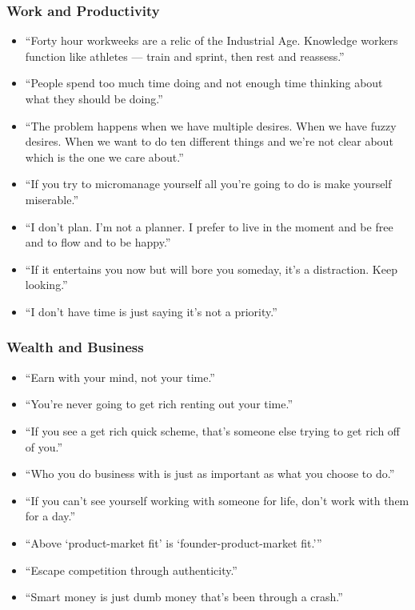 \begin{frame}[fragile]\frametitle{Work and Productivity}
      \begin{itemize}
        \item “Forty hour workweeks are a relic of the Industrial Age. Knowledge workers function like athletes — train and sprint, then rest and reassess.”
        \item “People spend too much time doing and not enough time thinking about what they should be doing.”
        \item “The problem happens when we have multiple desires. When we have fuzzy desires. When we want to do ten different things and we’re not clear about which is the one we care about.”
        \item “If you try to micromanage yourself all you’re going to do is make yourself miserable.”
        \item “I don’t plan. I’m not a planner. I prefer to live in the moment and be free and to flow and to be happy.”
        \item “If it entertains you now but will bore you someday, it’s a distraction. Keep looking.”
        \item “I don’t have time is just saying it’s not a priority.”
      \end{itemize}
\end{frame}
\begin{frame}[fragile]\frametitle{Wealth and Business}
      \begin{itemize}
        \item “Earn with your mind, not your time.”
        \item “You’re never going to get rich renting out your time.”
        \item “If you see a get rich quick scheme, that’s someone else trying to get rich off of you.”
        \item “Who you do business with is just as important as what you choose to do.”
        \item “If you can’t see yourself working with someone for life, don’t work with them for a day.”
        \item “Above ‘product-market fit’ is ‘founder-product-market fit.’”
        \item “Escape competition through authenticity.”
        \item “Smart money is just dumb money that’s been through a crash.”
      \end{itemize}
\end{frame}
